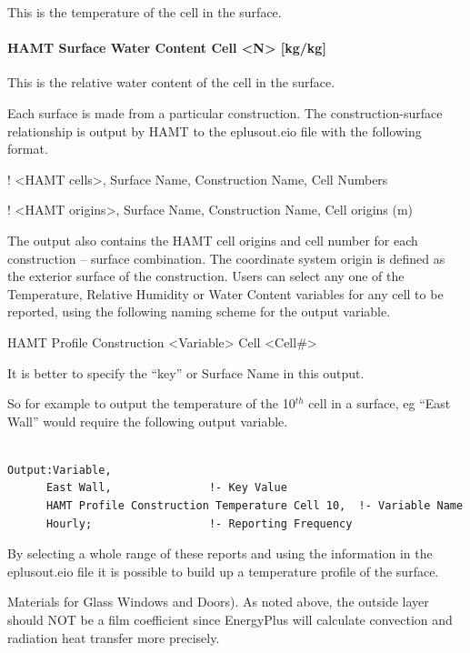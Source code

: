 This is the temperature of the cell in the surface.

\paragraph{HAMT Surface Water Content Cell \textless{}N\textgreater{} {[}kg/kg{]}}\label{hamt-surface-water-content-cell-n-kgkg-2}

This is the relative water content of the cell in the surface.

Each surface is made from a particular construction. The construction-surface relationship is output by HAMT to the eplusout.eio file with the following format.

! \textless{}HAMT cells\textgreater{}, Surface Name, Construction Name, Cell Numbers

! \textless{}HAMT origins\textgreater{}, Surface Name, Construction Name, Cell origins (m)

The output also contains the HAMT cell origins and cell number for each construction -- surface combination. The coordinate system origin is defined as the exterior surface of the construction. Users can select any one of the Temperature, Relative Humidity or Water Content variables for any cell to be reported, using the following naming scheme for the output variable.

HAMT Profile Construction \textless{}Variable\textgreater{} Cell \textless{}Cell\#\textgreater{}

It is better to specify the ``key'' or Surface Name in this output.

So for example to output the temperature of the 10\(^{th}\) cell in a surface, eg ``East Wall'' would require the following output variable.

\begin{lstlisting}

Output:Variable,
      East Wall,               !- Key Value
      HAMT Profile Construction Temperature Cell 10,  !- Variable Name
      Hourly;                  !- Reporting Frequency
\end{lstlisting}

By selecting a whole range of these reports and using the information in the eplusout.eio file it is possible to build up a temperature profile of the surface.

Materials for Glass Windows and Doors). As noted above, the outside layer should NOT be a film coefficient since EnergyPlus will calculate convection and radiation heat transfer more precisely.

